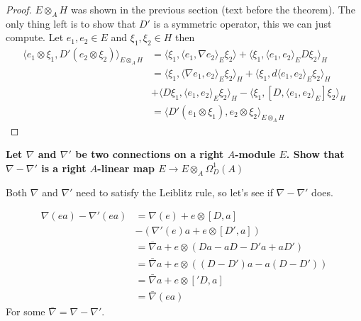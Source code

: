 \documentclass[a4paper]{article}
\newcounter{exercise}
\newenvironment{MyExercise}%
{\begin{mdframed}[style=exercisestyle]}{\end{mdframed}}
\theoremstyle{definition}
\theoremstyle{definition}
\theoremstyle{definition}
\theoremstyle{theorem}
\theoremstyle{theorem}
\begin{document}
\begin{proof}
    $E\otimes _A H$ was shown in the previous section (text before the
    theorem). The only thing left is to show that $D'$ is a symmetric
    operator, this we can just compute. Let $e_1, e_2 \in E$ and $\xi _1,
    \xi _2 \in H$ then
    \begin{align*}
        \langle e_1 \otimes \xi _1, D'(e_2 \otimes \xi_2)\rangle _{E\otimes _A H} &=
        \langle \xi _1, \langle e_1, \nabla e_2\rangle _E  \xi _2\rangle  + \langle \xi _1 , \langle e_1, e_2\rangle _E D\xi
        _2\rangle _H \\
        &= \langle \xi _1, \langle \nabla e_1, e_2\rangle _E \xi _2\rangle _H + \langle \xi _1, d\langle e_1, e_2\rangle  _E
        \xi _2\rangle _H \\
        &+ \langle D\xi _1,\langle e_1, e_2\rangle _E \xi _2\rangle _H - \langle \xi _1, [D, \langle e_1, e_2\rangle _E] \xi
        _2 \rangle _H \\
        &= \langle D'(e_1 \otimes \xi _1), e_2 \otimes \xi _2\rangle _{E \otimes _A H}
    \end{align*}
\end{proof}

\begin{MyExercise}
    \textbf{
    Let $\nabla$ and $\nabla'$ be two connections on a right $A$-module
    $E$. Show that $\nabla - \nabla'$ is a right $A$-linear map
    $E \rightarrow E\otimes _A \Omega _D^1(A)$
}\newline

    Both $\nabla$ and $\nabla'$ need to satisfy the Leiblitz rule, so
    let's see if $\nabla - \nabla'$ does.

    \begin{align*}
        \nabla(ea)-\nabla'(ea)&=\nabla(e) + e\otimes[D, a]\\
        &-(\nabla'(e)a + e\otimes[D',a])\\
        &=\bar{\nabla}a + e\otimes(Da-aD-D'a+aD')\\
        &=\bar{\nabla}a + e\otimes((D-D')a-a(D-D'))\\
        &=\bar{\nabla}a + e\otimes[\prime{D}, a]\\
        &=\bar{\nabla}(ea)
    \end{align*}
    For some $\bar{\nabla}=\nabla-\nabla'$.
\end{MyExercise}
\end{document}
